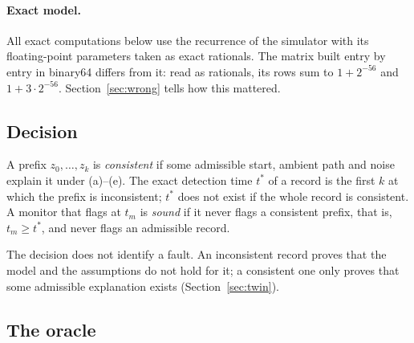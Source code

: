\documentclass[11pt,a4paper]{article}
\newcommand{\tstar}{t^{\ast}}
\begin{document}
\paragraph{Exact model.} All exact computations below use the recurrence of the simulator with its floating-point
parameters taken as exact rationals. The matrix built entry by entry in binary64 differs from it: read as rationals,
its rows sum to $1+2^{-56}$ and $1+3\cdot2^{-56}$. Section~\ref{sec:wrong} tells how this mattered.

\subsection{Decision}\label{sec:decision}

A prefix $z_0,\dots,z_k$ is \emph{consistent} if some admissible start, ambient path and noise explain it under
(a)--(e). The exact detection time $\tstar$ of a record is the first $k$ at which the prefix is inconsistent; $\tstar$
does not exist if the whole record is consistent. A monitor that flags at $t_m$ is \emph{sound} if it never flags a
consistent prefix, that is, $t_m\ge\tstar$, and never flags an admissible record.

The decision does not identify a fault. An inconsistent record proves that the model and the assumptions do not hold
for it; a consistent one only proves that some admissible explanation exists (Section~\ref{sec:twin}).

\subsection{The oracle}\label{sec:oracle}
\end{document}
